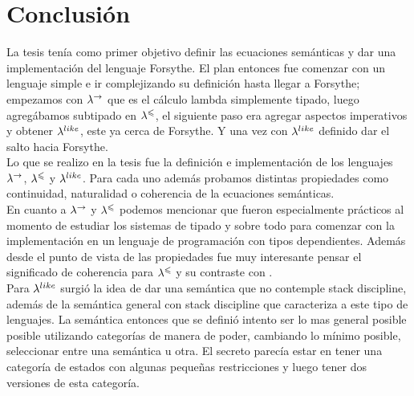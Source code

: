 \chapter{Conclusi\'on}

La tesis ten\'ia como primer objetivo definir las ecuaciones sem\'anticas
y dar una implementaci\'on del lenguaje Forsythe. El plan entonces fue
comenzar con un lenguaje simple e ir complejizando su definici\'on hasta
llegar a Forsythe; empezamos con $\lambda^{\rightarrow}$ que es el c\'alculo lambda
simplemente tipado, luego agreg\'abamos subtipado en $\lambda^{\leqslant}$, el siguiente
paso era agregar aspectos imperativos y obtener $\lambda^{like}$, este ya 
cerca de Forsythe. Y una vez con $\lambda^{like}$ definido dar el salto hacia 
Forsythe.\\

Lo que se realizo en la tesis fue la definici\'on e implementaci\'on de los 
lenguajes $\lambda^{\rightarrow}$, $\lambda^{\leqslant}$ y $\lambda^{like}$. Para cada uno adem\'as 
probamos distintas propiedades como continuidad, naturalidad o coherencia 
de la ecuaciones sem\'anticas.\\

En cuanto a $\lambda^{\rightarrow}$ y $\lambda^{\leqslant}$ podemos mencionar que fueron
especialmente pr\'acticos al momento de estudiar los sistemas de tipado y
sobre todo para comenzar con la implementaci\'on en un lenguaje de programaci\'on
con tipos dependientes. Adem\'as desde el punto de vista de las propiedades
fue muy interesante pensar el significado de coherencia para $\lambda^{\leqslant}$ y
su contraste con \cite[Prop 4]{coherencereynolds}.\\

Para $\lambda^{like}$ surgi\'o la idea de dar una sem\'antica que no contemple stack
discipline, adem\'as de la sem\'antica general con stack discipline que caracteriza 
a este tipo de lenguajes. La sem\'antica entonces que se defini\'o intento ser
lo mas general posible posible utilizando categor\'ias
de manera de poder, cambiando lo m\'inimo posible, seleccionar entre una
sem\'antica u otra. El secreto parec\'ia estar en tener una categor\'ia
de estados con algunas pequeñas restricciones y luego tener dos versiones
de esta categor\'ia.
